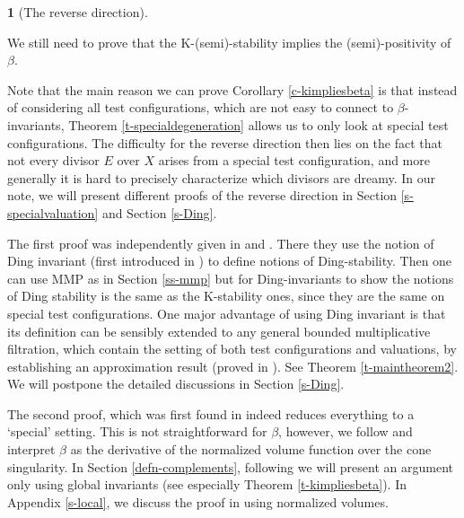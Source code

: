 \documentclass[12pt,reqno]{amsart}%
\theoremstyle{definition}
\newtheorem{say}[thm]{}
\theoremstyle{remark}
\begin{document}
\begin{say}[The reverse direction]\label{say-betaimpliesK}

We still need to prove that the K-(semi)-stability implies the (semi)-positivity of $\beta$. 

Note that the main reason we can prove Corollary \ref{c-kimpliesbeta} is that instead of considering all test configurations, which are not easy to connect to $\beta$-invariants, Theorem \ref{t-specialdegeneration} allows us to only look at special test configurations. 
The difficulty for the reverse direction then lies on the fact that not every divisor $E$ over $X$ arises from a special test configuration, and more generally it is hard to precisely characterize which divisors are dreamy.  In our note, we will present different proofs of the reverse direction in Section \ref{s-specialvaluation} and Section \ref{s-Ding}. 

The first proof was independently given in \cite{Fuj19b} and \cite{Li17}.  There they use the notion of Ding invariant (first introduced in \cite{Ber16})  to define notions of Ding-stability. %
Then one can use MMP as in Section \ref{ss-mmp} but for Ding-invariants to show the notions of Ding stability is the same as the K-stability ones, since they are the same on special test configurations.  One major advantage of using Ding invariant is that its definition can be sensibly extended to any general bounded multiplicative filtration, which contain the setting of both test configurations and valuations,  by establishing an approximation result (proved in \cite{Fuj18}). See Theorem \ref{t-maintheorem2}. We will postpone the detailed discussions in Section \ref{s-Ding}.


The second proof, which was first found in \cite{LX20} indeed reduces everything to a `special' setting. This is not straightforward for $\beta$, however, we follow \cite{Li17} and interpret $\beta$ as the derivative of the normalized volume function over the cone singularity. In Section \ref{defn-complements}, following \cite{BLX19} we will present an argument only using global invariants (see  especially Theorem \ref{t-kimpliesbeta}).
In Appendix \ref{s-local}, we discuss the proof in \cite{LX20} using normalized volumes.
\end{say}
\end{document}

